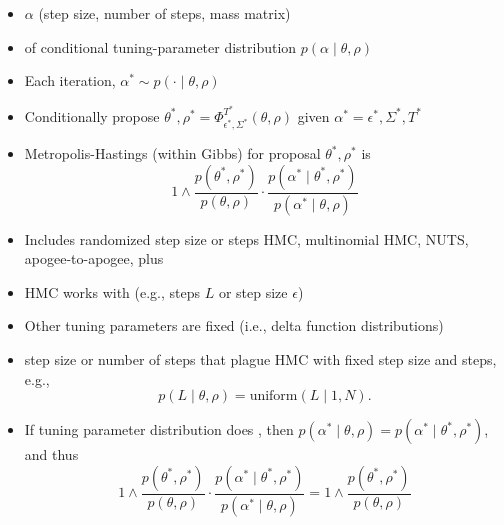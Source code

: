 \documentclass[10pt]{report}
\begin{document}
\begin{itemize}
\item {} $\alpha$ (step
  size, number of steps, mass matrix)
\item {} of conditional tuning-parameter distribution $p(\alpha \mid \theta, \rho)$
\item Each iteration,  $\alpha^* \sim p( \cdot \mid \theta,
  \rho)$
\item Conditionally propose $\theta^*, \rho^* = \Phi^{T^*}_{\epsilon^*,
    \Sigma^*}(\theta, \rho)$ given $\alpha^* = \epsilon^*,
  \Sigma^*, T^*$
\item Metropolis-Hastings (within Gibbs)  for proposal $\theta^*,
  \rho^*$ is
  $$
  1 \wedge
  \frac{p(\theta^*, \rho^*)}
  {p(\theta, \rho)}
  \cdot
  \frac{p(\alpha^* \mid \theta^*, \rho^*)}
       {p(\alpha^* \mid \theta, \rho)}
       $$
\item Includes randomized step size or steps HMC, multinomial HMC,
  NUTS, apogee-to-apogee, plus 
\end{itemize}

\begin{itemize}
\item HMC works with  (e.g., steps $L$ or
  step size $\epsilon$)
\item Other tuning parameters are fixed (i.e., delta function distributions)
\item {} step size or number of steps  that plague HMC with fixed step size and steps, e.g.,
  $$p(L \mid \theta, \rho) = \textrm{uniform}(L \mid 1, N).$$
\item If tuning parameter distribution does , then $p(\alpha^* \mid \theta, \rho) = p(\alpha^* \mid \theta^*,
  \rho^*)$, and thus
  $$
  1 \wedge
  \frac{p(\theta^*, \rho^*)}
       {p(\theta, \rho)}
  \cdot
  \frac{p(\alpha^* \mid \theta^*, \rho^*)}
       {p(\alpha^* \mid \theta, \rho)}
       =
       1 \wedge
       \frac{p(\theta^*, \rho^*)}{p(\theta, \rho)}
  $$       
\end{itemize}
\end{document}
